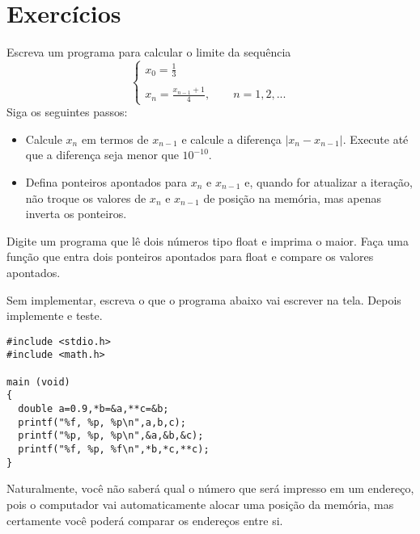 \section{Exercícios}
\begin{exer}Escreva um programa para calcular o limite da sequência
$$\left\{
\begin{array}{l}\displaystyle
 x_0=\frac{1}{3}\\\\ \displaystyle
 x_{n}=\frac{x_{n-1}+1}{4},\qquad n=1,2,...
\end{array}\right.
$$
Siga os seguintes passos:
\begin{itemize}
 \item Calcule $x_n$ em termos de $x_{n-1}$ e calcule a diferença $|x_n-x_{n-1}|$. Execute até que a diferença seja menor que $10^{-10}$.
 \item Defina ponteiros apontados para $x_n$ e $x_{n-1}$ e, quando for atualizar a iteração, não troque os valores de $x_n$ e $x_{n-1}$ de posição na memória, mas apenas inverta os ponteiros.
\end{itemize}
\end{exer}
\begin{exer}
Digite um programa que lê dois números tipo float e imprima o maior. Faça uma função que entra dois ponteiros apontados para float e compare os valores apontados.
\end{exer}
\begin{exer}
Sem implementar, escreva o que o programa abaixo vai escrever na tela. Depois implemente e teste.
\begin{verbatim}
#include <stdio.h>
#include <math.h>

main (void)
{
  double a=0.9,*b=&a,**c=&b;
  printf("%f, %p, %p\n",a,b,c);
  printf("%p, %p, %p\n",&a,&b,&c);
  printf("%f, %p, %f\n",*b,*c,**c);
}
\end{verbatim}
Naturalmente, você não saberá qual o número que será impresso em um endereço, pois o computador vai automaticamente alocar uma posição da memória, mas certamente você poderá comparar os endereços entre si.
\end{exer}
